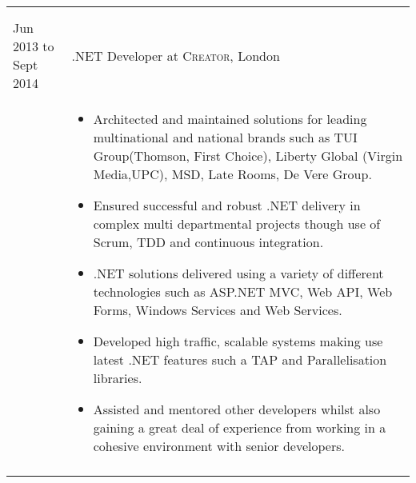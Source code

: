 \documentclass[a4paper,10pt]{article} %
\begin{document}
\begin{tabular}{ L{2cm} | L{11cm}}
\begin{itemize}[leftmargin=*]
	\end{itemize} \\
   
    
 
 \\






Jun 2013 to Sept 2014 & .NET Developer at \textsc{Creator}, London \\

 


 
&\MPtrue	   
	\begin{itemize}[leftmargin=*]
 
 
 
  
		\item Architected and maintained solutions for leading multinational and national brands such as TUI Group(Thomson, First Choice), Liberty Global (Virgin Media,UPC), MSD, Late Rooms, De Vere Group.

		\item Ensured successful and robust .NET delivery in complex multi departmental projects though use of Scrum, TDD and continuous integration. 

		\item .NET solutions delivered using a variety of different technologies such as ASP.NET MVC, Web API, Web Forms, Windows Services and Web Services. 
		
		\item Developed high traffic, scalable systems making use latest .NET features such a TAP and Parallelisation libraries. 
		
		\item Assisted and mentored other developers whilst also gaining a great deal of experience from working in a cohesive environment with senior developers. 

	\end{itemize} \\
   
    
 \\

\end{tabular}
\end{document}
